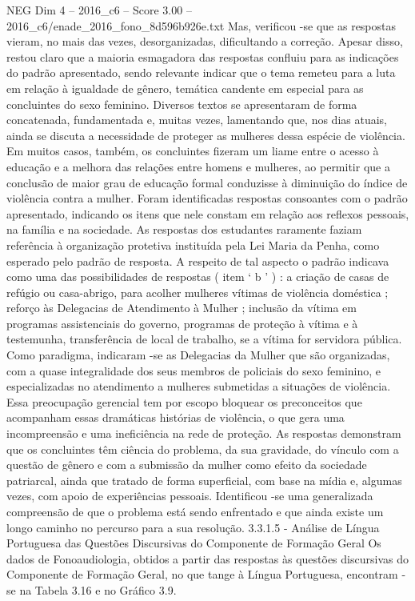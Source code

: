 \begin{textsample}{NEG Dim 4 – 2016\_c6 – Score 3.00 – 2016\_c6/enade\_2016\_fono\_8d596b926e.txt}
Mas, verificou -se que as respostas vieram, no mais das vezes, desorganizadas, dificultando a correção.
Apesar disso, restou claro que a maioria esmagadora das respostas confluiu para as indicações do padrão apresentado, sendo relevante indicar que o tema remeteu para a luta em relação à igualdade de gênero, temática candente em especial para as concluintes do sexo feminino.
Diversos textos se apresentaram de forma concatenada, fundamentada e, muitas vezes, lamentando que, nos dias atuais, ainda se discuta a necessidade de proteger as mulheres dessa espécie de violência.
Em muitos casos, também, os concluintes fizeram um liame entre o acesso à educação e a melhora das relações entre homens e mulheres, ao permitir que a conclusão de maior grau de educação formal conduzisse à diminuição do índice de violência contra a mulher.
Foram identificadas respostas consoantes com o padrão apresentado, indicando os itens que nele constam em relação aos reflexos pessoais, na família e na sociedade.
As respostas dos estudantes raramente faziam referência à organização protetiva instituída pela Lei Maria da Penha, como esperado pelo padrão de resposta.
A respeito de tal aspecto o padrão indicava como uma das possibilidades de respostas ( item ‘ b ’ ) : a criação de casas de refúgio ou casa-abrigo, para acolher mulheres vítimas de violência doméstica ; reforço às Delegacias de Atendimento à Mulher ; inclusão da vítima em programas assistenciais do governo, programas de proteção à vítima e à testemunha, transferência de local de trabalho, se a vítima for servidora pública.
Como paradigma, indicaram -se as Delegacias da Mulher que são organizadas, com a quase integralidade dos seus membros de policiais do sexo feminino, e especializadas no atendimento a mulheres submetidas a situações de violência.
Essa preocupação gerencial tem por escopo bloquear os preconceitos que acompanham essas dramáticas histórias de violência, o que gera uma incompreensão e uma ineficiência na rede de proteção.
As respostas demonstram que os concluintes têm ciência do problema, da sua gravidade, do vínculo com a questão de gênero e com a submissão da mulher como efeito da sociedade patriarcal, ainda que tratado de forma superficial, com base na mídia e, algumas vezes, com apoio de experiências pessoais.
Identificou -se uma generalizada compreensão de que o problema está sendo enfrentado e que ainda existe um longo caminho no percurso para a sua resolução. 3.3.1.5 - Análise de Língua Portuguesa das Questões Discursivas do Componente de Formação Geral Os dados de Fonoaudiologia, obtidos a partir das respostas às questões discursivas do Componente de Formação Geral, no que tange à Língua Portuguesa, encontram -se na Tabela 3.16 e no Gráfico 3.9.

\end{textsample}
